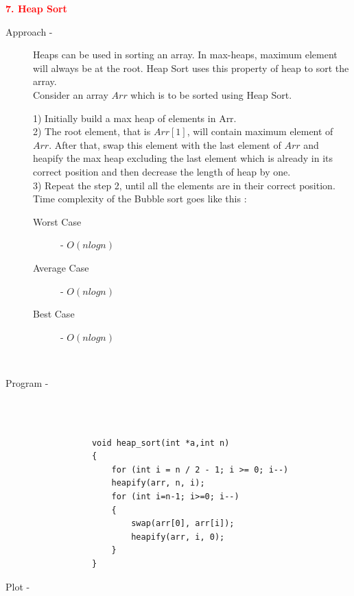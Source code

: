 \documentclass[0pt]{article}
\begin{document}
	
	
	
	
	
	
	
	
	
	
	
	
	
	
	
	
	
	
	
	
	
	
	
	
	
	
	
	
	
	
	
	\begin{flushleft}
		\textbf{\textcolor{red}{7. Heap Sort}}
		\leavevmode \\
		\begin{description}
			\item[Approach - ] Heaps can be used in sorting an array. In max-heaps, maximum element will always be at the root. Heap Sort uses this property of heap to sort the array.
			\leavevmode \\
			Consider an array \(Arr\) which is to be sorted using Heap Sort.
			
			1) Initially build a max heap of elements in Arr.
			\leavevmode \\
			2) The root element, that is \(Arr[1]\), will contain maximum element of \(Arr\). After that, swap this element with the last element of \(Arr\) and heapify the max heap excluding the last element which is already in its correct position and then decrease the length of heap by one.
			\leavevmode \\
			3) Repeat the step 2, until all the elements are in their correct position.
			Time complexity of the Bubble sort goes like this :  
			\leavevmode \\
			\begin{description}
				\item[Worst Case] - \(O(nlogn)\)
				\item[Average Case] - \(O(nlogn)\)
				\item[Best Case] - \(O(nlogn)\)
			\end{description}
			\leavevmode \\
			\item[Program - ] \leavevmode \\
			\leavevmode \\
			\begin{lstlisting}
			void heap_sort(int *a,int n)
			{
				for (int i = n / 2 - 1; i >= 0; i--)
				heapify(arr, n, i);
				for (int i=n-1; i>=0; i--)
				{
					swap(arr[0], arr[i]);
					heapify(arr, i, 0);
				}	
			}
			\end{lstlisting}
			\item[Plot - ] \leavevmode \\
		\end{description}
	\end{flushleft}
\end{document}
